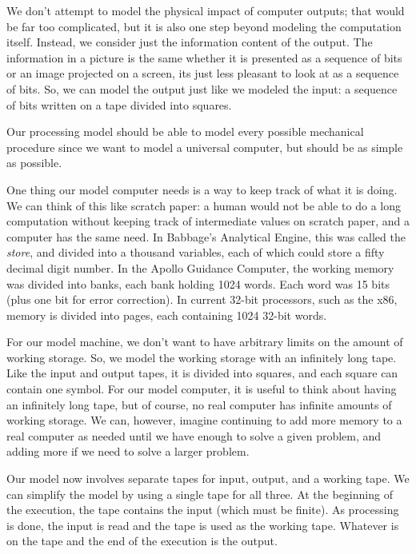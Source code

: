 \begin{schemeregion}
We don't attempt to model the physical impact of computer outputs; that would be far too complicated, but it is also one step beyond modeling the computation itself.  Instead, we consider just the information content of the output.  The information in a picture is the same whether it is presented as a sequence of bits or an image projected on a screen, its just less pleasant to look at as a sequence of bits.  So, we can model the output just like we modeled the input: a sequence of bits written on a tape divided into squares.

  Our processing model should be able to model every possible mechanical procedure since we want to model a universal computer, but should be as simple as possible.  

One thing our model computer needs is a way to keep track of what it is doing.  We can think of this like scratch paper: a human would not be able to do a long computation without keeping track of intermediate values on scratch paper, and a computer has the same need.  In Babbage's Analytical Engine, this was called the \emph{store}, and divided into a thousand variables, each of which could store a fifty decimal digit number.  In the Apollo Guidance Computer, the working memory was divided into banks, each bank holding 1024 words.  Each word was 15 bits (plus one bit for error correction).  In current 32-bit processors, such as the x86, memory is divided into pages, each containing 1024 32-bit words.  

For our model machine, we don't want to have arbitrary limits on the amount of working storage.  So, we model the working storage with an infinitely long tape.  Like the input and output tapes, it is divided into squares, and each square can contain one symbol.  For our model computer, it is useful to think about having an infinitely long tape, but of course, no real computer has infinite amounts of working storage.  We can, however, imagine continuing to add more memory to a real computer as needed until we have enough to solve a given problem, and adding more if we need to solve a larger problem.  

Our model now involves separate tapes for input, output, and a working tape.  We can simplify the model by using a single tape for all three.  At the beginning of the execution, the tape contains the input (which must be finite).  As processing is done, the input is read and the tape is used as the working tape.  Whatever is on the tape and the end of the execution is the output.


\end{schemeregion}
